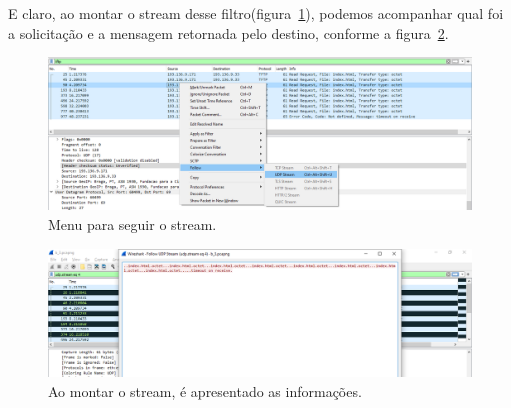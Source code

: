 \documentclass{llncs}
\begin{document}
\begin{enumerate}[\textbf{b)}]
    \begin{flushleft}
      \par E claro, ao montar o stream desse filtro(figura~\ref{fig:stream3}), podemos acompanhar qual foi a solicitação e a mensagem retornada pelo destino, conforme a figura~\ref{fig:followstream01}.
      \begin{figure}[h]
        \includegraphics[scale=0.3]{stream3.png}
        \centering
        \caption{Menu para seguir o stream.}
        \label{fig:stream3}
      \end{figure} 
      \begin{figure}[h]
        \includegraphics[scale=0.3]{followstream01.png}
        \centering
        \caption{Ao montar o stream, é apresentado as informações.}
        \label{fig:followstream01}
      \end{figure} 
    \end{flushleft}


  \end{enumerate}
\end{document}
